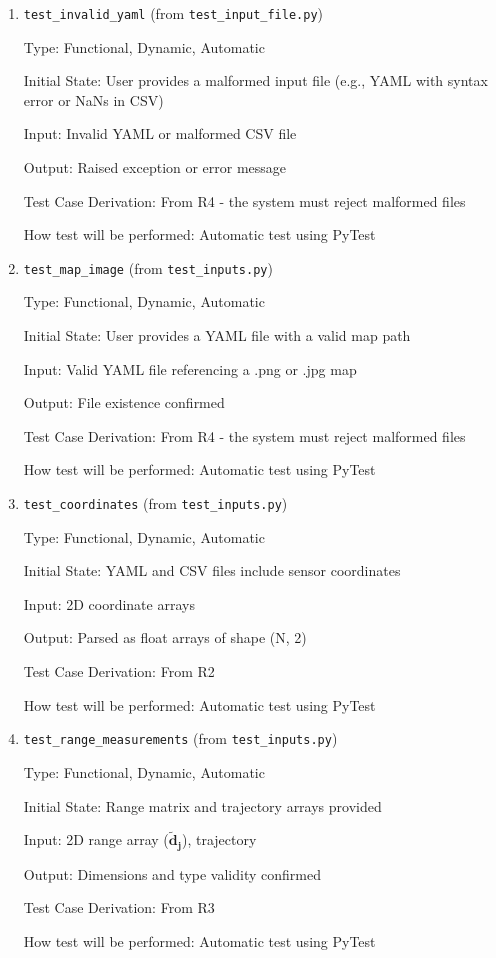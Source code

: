 \documentclass[12pt, titlepage]{article}
\begin{document}
\begin{enumerate}

\item{\texttt{test\_invalid\_yaml} (from \texttt{test\_input\_file.py})\\}

Type: Functional, Dynamic, Automatic
					
Initial State: User provides a malformed input file (e.g., YAML with syntax error or NaNs in CSV)
					
Input: Invalid YAML or malformed CSV file
					
Output: Raised exception or error message

Test Case Derivation: From R4 - the system must reject malformed files

How test will be performed: Automatic test using PyTest
					
\item{\texttt{test\_map\_image} (from \texttt{test\_inputs.py})\\}

Type: Functional, Dynamic, Automatic
					
Initial State: User provides a YAML file with a valid map path
					
Input: Valid YAML file referencing a .png or .jpg map
					
Output: File existence confirmed

Test Case Derivation: From R4 - the system must reject malformed files

How test will be performed: Automatic test using PyTest

\item{\texttt{test\_coordinates} (from \texttt{test\_inputs.py})\\}

Type: Functional, Dynamic, Automatic
					
Initial State: YAML and CSV files include sensor coordinates
					
Input: 2D coordinate arrays
					
Output: Parsed as float arrays of shape (N, 2)

Test Case Derivation: From R2

How test will be performed: Automatic test using PyTest

\item{\texttt{test\_range\_measurements} (from \texttt{test\_inputs.py})\\}

Type: Functional, Dynamic, Automatic
					
Initial State: Range matrix and trajectory arrays provided
					
Input: 2D range array ($\mathbf{\tilde{d}_j}$), trajectory
					
Output: Dimensions and type validity confirmed

Test Case Derivation: From R3

How test will be performed: Automatic test using PyTest
    
\end{enumerate}
\end{document}
